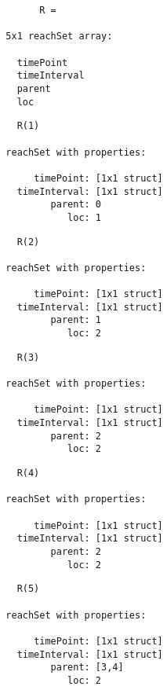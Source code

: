 \begin{center}
\begin{minipage}[t]{0.32\textwidth}
	\footnotesize
	\begin{verbatim}
		R = 

  5x1 reachSet array:

    timePoint
    timeInterval
    parent
    loc
	\end{verbatim}
\end{minipage}
\begin{minipage}[t]{0.32\textwidth}
	\footnotesize
	\begin{verbatim}
	R(1)

  reachSet with properties:

       timePoint: [1x1 struct]
    timeInterval: [1x1 struct]
          parent: 0
             loc: 1
	\end{verbatim}
\end{minipage}
\begin{minipage}[t]{0.32\textwidth}
	\footnotesize
	\begin{verbatim}
	R(2)

  reachSet with properties:

       timePoint: [1x1 struct]
    timeInterval: [1x1 struct]
          parent: 1
             loc: 2
	\end{verbatim}
\end{minipage}
\end{center}

\vspace{0.1cm}

\begin{center}
\begin{minipage}[t]{0.32\textwidth}
	\footnotesize
	\begin{verbatim}
	R(3)

  reachSet with properties:

       timePoint: [1x1 struct]
    timeInterval: [1x1 struct]
          parent: 2
             loc: 2
	\end{verbatim}
\end{minipage}
\begin{minipage}[t]{0.32\textwidth}
	\footnotesize
	\begin{verbatim}
	R(4)

  reachSet with properties:

       timePoint: [1x1 struct]
    timeInterval: [1x1 struct]
          parent: 2
             loc: 2
	\end{verbatim}
\end{minipage}
\begin{minipage}[t]{0.32\textwidth}
	\footnotesize
	\begin{verbatim}
	R(5)

  reachSet with properties:

       timePoint: [1x1 struct]
    timeInterval: [1x1 struct]
          parent: [3,4]
             loc: 2
	\end{verbatim}
\end{minipage}
\end{center}


